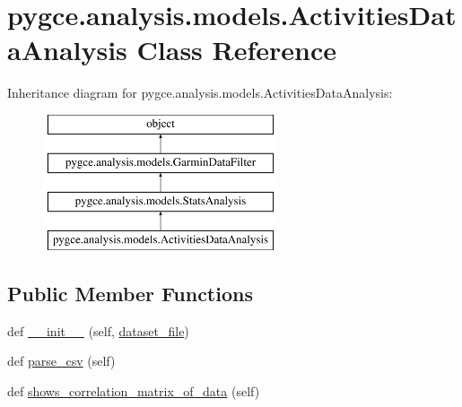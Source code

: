 \hypertarget{classpygce_1_1analysis_1_1models_1_1_activities_data_analysis}{}\section{pygce.\+analysis.\+models.\+Activities\+Data\+Analysis Class Reference}
\label{classpygce_1_1analysis_1_1models_1_1_activities_data_analysis}
Inheritance diagram for pygce.\+analysis.\+models.\+Activities\+Data\+Analysis\+:\begin{figure}[H]
\begin{center}
\leavevmode
\includegraphics[height=4.000000cm]{classpygce_1_1analysis_1_1models_1_1_activities_data_analysis}
\end{center}
\end{figure}
\subsection*{Public Member Functions}
\begin{DoxyCompactItemize}
\item 
def \hyperlink{classpygce_1_1analysis_1_1models_1_1_activities_data_analysis_a6196617473672f614453a357bcb09799}{\+\_\+\+\_\+init\+\_\+\+\_\+} (self, \hyperlink{classpygce_1_1analysis_1_1models_1_1_garmin_data_filter_a7bb7be05577c2d31546e27823a5d11c5}{dataset\+\_\+file})
\item 
def \hyperlink{classpygce_1_1analysis_1_1models_1_1_activities_data_analysis_a5b3ad1747c5ff3a8cd868ebf8e5724ae}{parse\+\_\+csv} (self)
\item 
def \hyperlink{classpygce_1_1analysis_1_1models_1_1_activities_data_analysis_a7aac6979906baac1801dc83b5ea40360}{shows\+\_\+correlation\+\_\+matrix\+\_\+of\+\_\+data} (self)
\end{DoxyCompactItemize}
